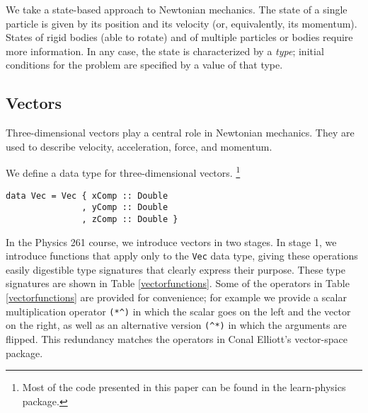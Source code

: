 \documentclass[11pt]{article}
\begin{document}
We take a state-based approach to Newtonian mechanics.
The state of a single particle is given by its position and its
velocity (or, equivalently, its momentum).  States of rigid bodies
(able to rotate) and of multiple particles or bodies require more information.
In any case, the state is characterized by a \emph{type};
initial conditions for the problem are specified by a value of that type.

\subsection{Vectors}

Three-dimensional vectors play a central role in Newtonian mechanics.
They are used to describe velocity, acceleration, force, and momentum.

We define a data type for three-dimensional vectors.
\footnote{Most of the code presented in this paper can be found in the
learn-physics package\cite{learn-physics}.}
\begin{verbatim}
data Vec = Vec { xComp :: Double
               , yComp :: Double
               , zComp :: Double }
\end{verbatim}

In the Physics 261 course, we introduce vectors in two stages.
In stage 1, we introduce functions that apply only to
the \verb|Vec| data type, giving these operations easily digestible
type signatures that clearly express their purpose.  These type
signatures are shown in Table \ref{vectorfunctions}.
Some of the operators in Table \ref{vectorfunctions}
are provided for convenience; for example
we provide a scalar multiplication operator \verb|(*^)| in which
the scalar goes on the left and the vector on the right,
as well as an alternative version \verb|(^*)| in which the
arguments are flipped.  This redundancy matches the operators
in Conal Elliott's vector-space package\cite{vector-space}.
\end{document}
